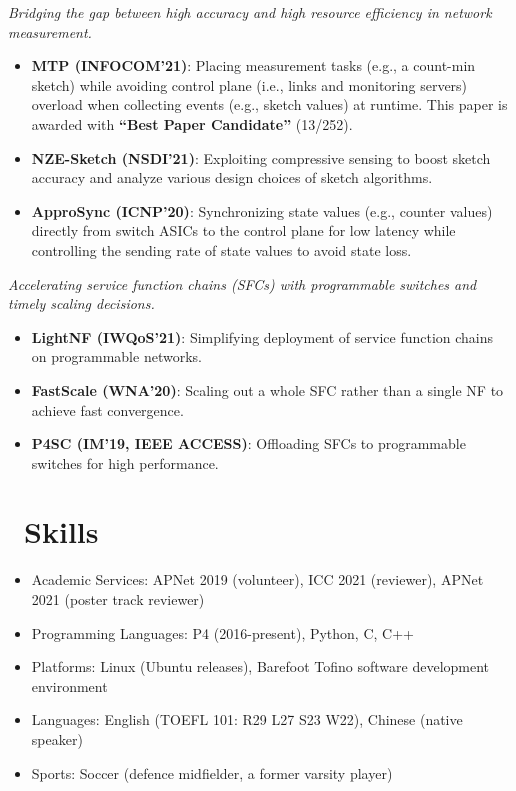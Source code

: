 \documentclass{resume}
\begin{document}
\emph{Bridging the gap between high accuracy and high resource efficiency in network measurement.}
\begin{itemize}
  \item \textbf{MTP (INFOCOM'21)}: Placing measurement tasks (e.g., a count-min sketch) while avoiding control plane (i.e., links and monitoring servers) overload when collecting events (e.g., sketch values) at runtime. This paper is awarded with \textbf{``Best Paper Candidate''} (13/252). 
  \item \textbf{NZE-Sketch (NSDI'21)}: Exploiting compressive sensing to boost sketch accuracy and analyze various design choices of sketch algorithms. 
  \item \textbf{ApproSync (ICNP'20)}: Synchronizing state values (e.g., counter values) directly from switch ASICs to the control plane for low latency while controlling the sending rate of state values to avoid state loss.
\end{itemize}

\emph{Accelerating service function chains (SFCs) with programmable switches and timely scaling decisions.}
\begin{itemize}
  \item \textbf{LightNF (IWQoS'21)}: Simplifying deployment of service function chains on programmable networks. 
  \item \textbf{FastScale (WNA'20)}: Scaling out a whole SFC rather than a single NF to achieve fast convergence. 
  \item \textbf{P4SC (IM'19, IEEE ACCESS)}: Offloading SFCs to programmable switches for high performance.
\end{itemize}


\section{\faCogs\ Skills}
\begin{itemize}[parsep=0.5ex]
  \item Academic Services: APNet 2019 (volunteer), ICC 2021 (reviewer), APNet 2021 (poster track reviewer)
  \item Programming Languages: P4 (2016-present), Python, C, C++
  \item Platforms: Linux (Ubuntu releases), Barefoot Tofino software development environment
  \item Languages: English (TOEFL 101: R29 L27 S23 W22), Chinese (native speaker)
  \item Sports: Soccer (defence midfielder, a former varsity player)
\end{itemize}
\end{document}
